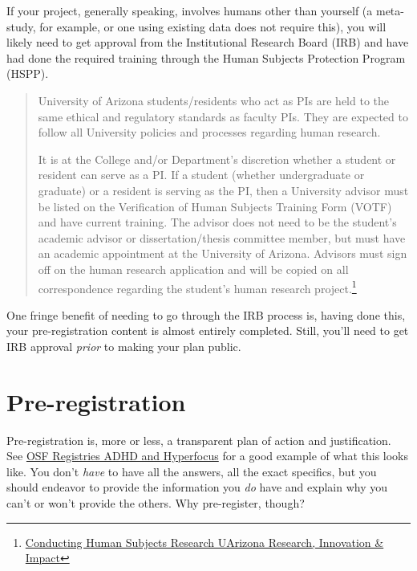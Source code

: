 \documentclass[
]{book}
\begin{document}
If your project, generally speaking, involves humans other than yourself (a meta-study, for example, or one using existing data does not require this), you will likely need to get approval from the Institutional Research Board (IRB) and have had done the required training through the Human Subjects Protection Program (HSPP).

\begin{quote}
University of Arizona students/residents who act as PIs are held to the same ethical and regulatory standards as faculty PIs. They are expected to follow all University policies and processes regarding human research.

It is at the College and/or Department's discretion whether a student or resident can serve as a PI. If a student (whether undergraduate or graduate) or a resident is serving as the PI, then a University advisor must be listed on the Verification of Human Subjects Training Form (VOTF) and have current training. The advisor does not need to be the student's academic advisor or dissertation/thesis committee member, but must have an academic appointment at the University of Arizona. Advisors must sign off on the human research application and will be copied on all correspondence regarding the student's human research project.\footnote{\href{https://research.arizona.edu/administration/getting-started/Principal-Investigator-Eligibility/conducting-human-subjects-research}{Conducting Human Subjects Research \textbar{} UArizona Research, Innovation \& Impact}}
\end{quote}

One fringe benefit of needing to go through the IRB process is, having done this, your pre-registration content is almost entirely completed. Still, you'll need to get IRB approval \emph{prior} to making your plan public.

\hypertarget{pre-registration}{%
\section{Pre-registration}\label{pre-registration}}

Pre-registration is, more or less, a transparent plan of action and justification. See \href{https://osf.io/ta92r}{OSF Registries \textbar{} ADHD and Hyperfocus} for a good example of what this looks like. You don't \emph{have} to have all the answers, all the exact specifics, but you should endeavor to provide the information you \emph{do} have and explain why you can't or won't provide the others. Why pre-register, though?
\end{document}
